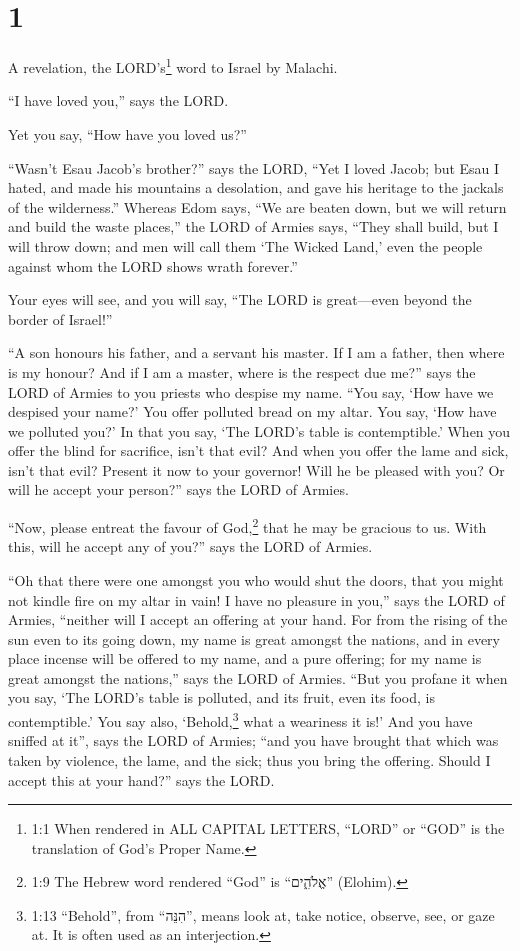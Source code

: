 \hypertarget{section}{%
\section{1}\label{section}}

 A revelation, the LORD's\footnote{1:1 When rendered in ALL
  CAPITAL LETTERS, ``LORD'' or ``GOD'' is the translation of God's
  Proper Name.} word to Israel by Malachi.

 ``I have loved you,'' says the LORD.

Yet you say, ``How have you loved us?''

``Wasn't Esau Jacob's brother?'' says the LORD, ``Yet I loved Jacob;
 but Esau I hated, and made his mountains a desolation, and
gave his heritage to the jackals of the wilderness.'' 
Whereas Edom says, ``We are beaten down, but we will return and build
the waste places,'' the LORD of Armies says, ``They shall build, but I
will throw down; and men will call them `The Wicked Land,' even the
people against whom the LORD shows wrath forever.''

 Your eyes will see, and you will say, ``The LORD is
great---even beyond the border of Israel!''

 ``A son honours his father, and a servant his master. If I
am a father, then where is my honour? And if I am a master, where is the
respect due me?'' says the LORD of Armies to you priests who despise my
name. ``You say, `How have we despised your name?'  You
offer polluted bread on my altar. You say, `How have we polluted you?'
In that you say, `The LORD's table is contemptible.'  When
you offer the blind for sacrifice, isn't that evil? And when you offer
the lame and sick, isn't that evil? Present it now to your governor!
Will he be pleased with you? Or will he accept your person?'' says the
LORD of Armies.

 ``Now, please entreat the favour of God,\footnote{1:9 The
  Hebrew word rendered ``God'' is ``אֱלֹהִ֑ים'' (Elohim).} that he may
be gracious to us. With this, will he accept any of you?'' says the LORD
of Armies.

 ``Oh that there were one amongst you who would shut the
doors, that you might not kindle fire on my altar in vain! I have no
pleasure in you,'' says the LORD of Armies, ``neither will I accept an
offering at your hand.  For from the rising of the sun even
to its going down, my name is great amongst the nations, and in every
place incense will be offered to my name, and a pure offering; for my
name is great amongst the nations,'' says the LORD of Armies.
 ``But you profane it when you say, `The LORD's table is
polluted, and its fruit, even its food, is contemptible.' 
You say also, `Behold,\footnote{1:13 ``Behold'', from ``הִנֵּה'', means
  look at, take notice, observe, see, or gaze at. It is often used as an
  interjection.} what a weariness it is!' And you have sniffed at it'',
says the LORD of Armies; ``and you have brought that which was taken by
violence, the lame, and the sick; thus you bring the offering. Should I
accept this at your hand?'' says the LORD.

